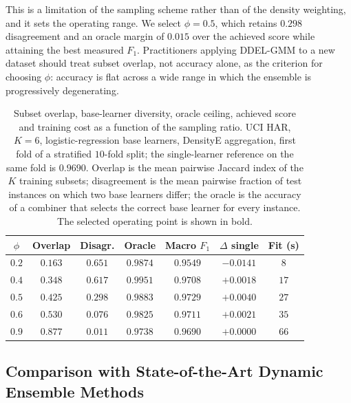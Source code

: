 \documentclass[lettersize,journal]{IEEEtran}
\begin{document}
	This is a limitation of the sampling scheme rather than of the density weighting, and it
	sets the operating range. We select $\phi = 0.5$, which retains $0.298$ disagreement and
	an oracle margin of $0.015$ over the achieved score while attaining the best measured
	$F_1$. Practitioners applying DDEL-GMM to a new dataset should treat subset overlap, not
	accuracy alone, as the criterion for choosing $\phi$: accuracy is flat across a wide
	range in which the ensemble is progressively degenerating.

	\begin{table}[!t]
		\centering
		\caption{Subset overlap, base-learner diversity, oracle ceiling, achieved score and
		training cost as a function of the sampling ratio. UCI HAR, $K = 6$,
		logistic-regression base learners, DensityE aggregation, first fold of a stratified
		$10$-fold split; the single-learner reference on the same fold is $0.9690$. Overlap is
		the mean pairwise Jaccard index of the $K$ training subsets; disagreement is the mean
		pairwise fraction of test instances on which two base learners differ; the oracle is
		the accuracy of a combiner that selects the correct base learner for every instance.
		The selected operating point is shown in bold.}
		\label{tab:diversity_cost}
		\begin{tabular}{ccccccc}
			\hline
			$\phi$ & Overlap & Disagr. & Oracle & Macro $F_1$ & $\Delta$ single & Fit (s) \\
			\hline
			$0.2$ & $0.163$ & $0.651$ & $0.9874$ & $0.9549$ & $-0.0141$ & $8$ \\
			$0.4$ & $0.348$ & $0.617$ & $0.9951$ & $0.9708$ & $+0.0018$ & $17$ \\
			$0.5$ & $0.425$ & $0.298$ & $0.9883$ & $\mathbf{0.9729}$ & $+0.0040$ & $27$ \\
			$0.6$ & $0.530$ & $0.076$ & $0.9825$ & $0.9711$ & $+0.0021$ & $35$ \\
			$0.9$ & $0.877$ & $0.011$ & $0.9738$ & $0.9690$ & $+0.0000$ & $66$ \\
			\hline
		\end{tabular}
	\end{table}

	\subsection{Comparison with State-of-the-Art Dynamic Ensemble Methods}
	
\end{document}
